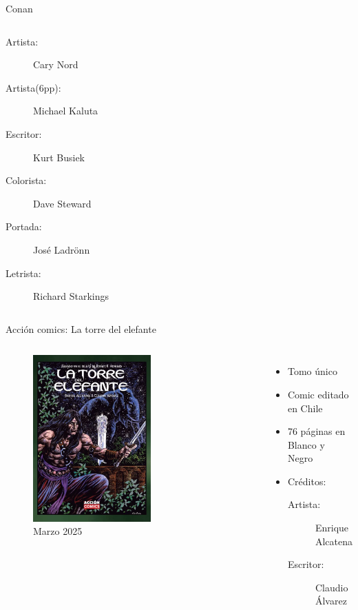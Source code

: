 \begin{frame}{Conan}
\begin{columns}
\begin{itemize}
         \begin{description}
            \item[Artista:] Cary Nord
            \item[Artista(6pp):] Michael Kaluta
            \item[Escritor:] Kurt Busiek
            \item[Colorista:] Dave Steward
            \item[Portada:] José Ladrönn
            \item[Letrista:] Richard Starkings
         \end{description}
    \end{itemize}
\end{columns}
\end{frame}
\note{

}

\begin{frame}{Acción comics: La torre del elefante}
	\begin{columns}
		\begin{figure}[htb]
			\centering
			\includegraphics[width=0.6\textwidth]{img/AlcatenaTorre}
			\caption{Marzo 2025}
		\end{figure}
		\begin{itemize}
			\item Tomo único
			\item Comic editado en Chile
			\item 76 páginas en Blanco y Negro
			\item Créditos:
			\begin{description}
				\item[Artista:] Enrique Alcatena
				\item[Escritor:] Claudio Álvarez
			\end{description}
		\end{itemize}
	\end{columns}
\end{frame}
\note{

}

